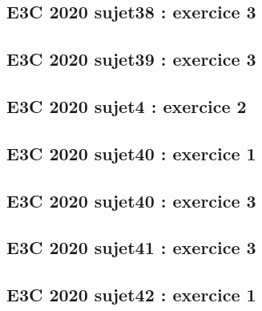 \documentclass[lang=fr,edition=teacher,layout=sheet]{mxbook}
\begin{document}
\begingroup\endgroup
\par\bigskip
{}\subsection*{E3C 2020 sujet38 : exercice 3}
\begingroup\endgroup
\par\bigskip
{}\subsection*{E3C 2020 sujet39 : exercice 3}
\begingroup\endgroup
\par\bigskip
{}\subsection*{E3C 2020 sujet4 : exercice 2}
\begingroup\endgroup
\par\bigskip
{}\subsection*{E3C 2020 sujet40 : exercice 1}
\begingroup\endgroup
\par\bigskip
{}\subsection*{E3C 2020 sujet40 : exercice 3}
\begingroup\endgroup
\par\bigskip
{}\subsection*{E3C 2020 sujet41 : exercice 3}
\begingroup\endgroup
\par\bigskip
{}\subsection*{E3C 2020 sujet42 : exercice 1}
\begingroup\endgroup
\end{document}
